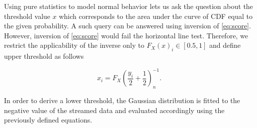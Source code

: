 Using pure statistics to model normal behavior lets us ask the question about the threshold value \(x\) which corresponds to the area under the curve of CDF equal to the given probability. A such query can be answered using inversion of \eqref{eq:score}. However, inversion of \eqref{eq:score} would fail the horizontal line test. Therefore, we restrict the applicability of the inverse only to \(F_X(x)_i \in [0.5, 1]\) and define upper threshold as follows

\begin{equation}
x_i = F_X\left(\frac{y_i}{2}+\frac{1}{2}\right)^{-1}_n\text{.}\label{realthresh}
\end{equation}

In order to derive a lower threshold, the Gaussian distribution is fitted to the negative value of the streamed data and evaluated accordingly using the previously defined equations.